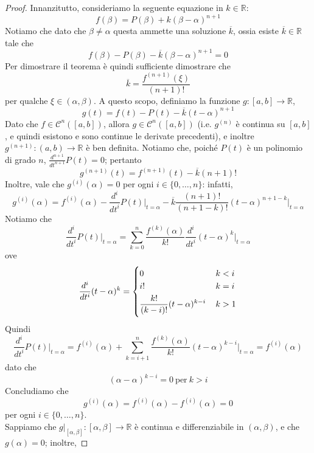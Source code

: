 \begin{proof}
    Innanzitutto, consideriamo la seguente equazione in $k\in\mathbb{R}$:
    \begin{equation}
        \label{eq:9n.1}
        f(\beta)=P(\beta)+k(\beta-\alpha)^{n+1}
    \end{equation}
    Notiamo che dato che $\beta\ne \alpha$ questa ammette una soluzione $\overline{k}$, ossia esiste $\overline{k}\in\mathbb{R}$ tale che
    \begin{equation}
        \label{eq:9n.2}
        f(\beta)-P(\beta)-\overline{k}(\beta-\alpha)^{n+1}=0
    \end{equation}
    Per dimostrare il teorema è quindi sufficiente dimostrare che
    \[
    \overline{k} = \frac{f^{(n+1)}(\xi)}{(n+1)!}
    \]
    per qualche $\xi\in(\alpha,\beta)$. A questo scopo, definiamo la funzione $g\colon [a,b]\to \mathbb{R}$,
    \[
    g(t) = f(t)-P(t)-\overline{k}(t-\alpha)^{n+1}
    \]
    Dato che $f\in \mathscr{C}^n([a,b])$, allora $g\in\mathscr{C}^{n}([a,b])$ (i.e. $g^{(n)}$ è continua su $[a,b]$, e quindi esistono e sono continue le derivate precedenti), e inoltre $g^{(n+1)}\colon(a,b)\to\mathbb{R}$ è ben definita. Notiamo che, poiché $P(t)$ è un polinomio di grado $n$, $\frac{d^{n+1}}{dt^{n+1}}P(t)=0$; pertanto
    \[
    g^{(n+1)}(t) = f^{(n+1)}(t)-\overline{k}(n+1)!
    \]
    Inoltre, vale che $g^{(i)}(\alpha)=0$ per ogni $i\in\{0, \dots, n\}$: infatti,
    \[
    g^{(i)}(\alpha)=f^{(i)}(\alpha)-\frac{d^i}{dt^i}P(t)\bigg|_{t=\alpha}-\overline{k}\frac{(n+1)!}{(n+1-k)!}(t-\alpha)^{n+1-k}\bigg|_{t=\alpha}
    \]
    Notiamo che
    \[
    \frac{d^i}{dt^i}P(t)\bigg|_{t=\alpha} = \sum_{k=0}^n \frac{f^{(k)}(\alpha)}{k!}\frac{d^i}{dt^i}(t-\alpha)^{k}\bigg|_{t=\alpha} 
    \]
    ove
    \[
    \frac{d^i}{dt^i}(t-\alpha)^k = \begin{dcases}
        0\, & k<i\\
        i!\, &k=i\\
        \frac{k!}{(k-i)!}(t-\alpha)^{k-i}\, & k>1
    \end{dcases}
    \]
    Quindi
    \[
    \frac{d^i}{dt^i}P(t)\bigg|_{t=\alpha}=f^{(i)}(\alpha)+\sum_{k=i+1}^n\frac{f^{(k)}(\alpha)}{k!}(t-\alpha)^{k-i}\bigg|_{t=\alpha} = f^{(i)}(\alpha)
    \]
    dato che
    \[
    (\alpha-\alpha)^{k-i} = 0 \ \text{per} \ k>i
    \]
    Concludiamo che
    \[
    g^{(i)}(\alpha) = f^{(i)}(\alpha) - f^{(i)}(\alpha) = 0
    \]
    per ogni $i\in\{0, \dots, n\}$. \\
    Sappiamo che $g|_{[\alpha,\beta]}\colon [\alpha, \beta]\to \mathbb{R}$ è continua e differenziabile in $(\alpha,\beta)$, e che $g(\alpha)=0$; inoltre,

\end{proof}
